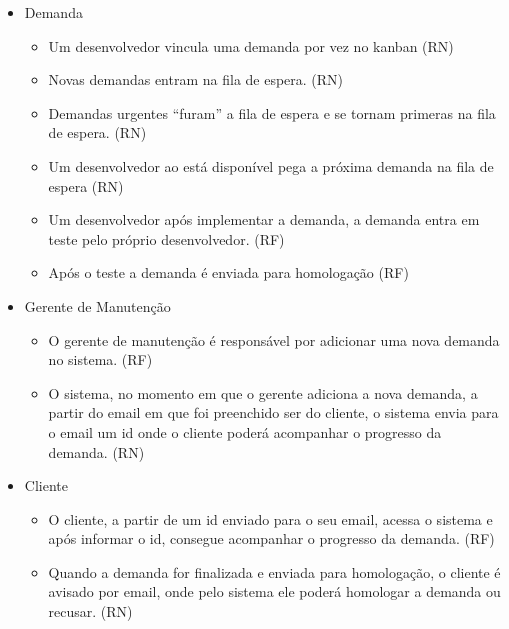 \begin{itemize}
	\item Demanda
		\begin{itemize}
			\item Um desenvolvedor vincula uma demanda por vez no kanban (RN)

			\item Novas demandas entram na fila de espera. (RN)

			\item Demandas urgentes “furam” a fila de espera e se tornam primeras na fila de espera. (RN)

			\item Um desenvolvedor ao está disponível pega a próxima demanda na fila de espera (RN)

			\item Um desenvolvedor após implementar a demanda, a demanda entra em teste pelo próprio desenvolvedor. (RF)

			\item Após o teste a demanda é enviada para homologação (RF)
		\end{itemize}
	\item Gerente de Manutenção
		\begin{itemize}
			\item O gerente de manutenção é responsável por adicionar uma nova demanda no sistema. (RF)

			\item O sistema, no momento em que o gerente adiciona a nova demanda, a partir do email em que foi preenchido ser do cliente, o sistema envia para o email um id onde o cliente poderá acompanhar o progresso da demanda. (RN)
		\end{itemize}
	\item Cliente
		\begin{itemize}
			\item O cliente, a partir de um id enviado para o seu email, acessa o sistema e após informar o id, consegue acompanhar o progresso da demanda. (RF)
			\item Quando a demanda for finalizada e enviada para homologação, o cliente é avisado por email, onde pelo sistema ele poderá homologar a demanda ou recusar. (RN)
		\end{itemize}
\end{itemize}